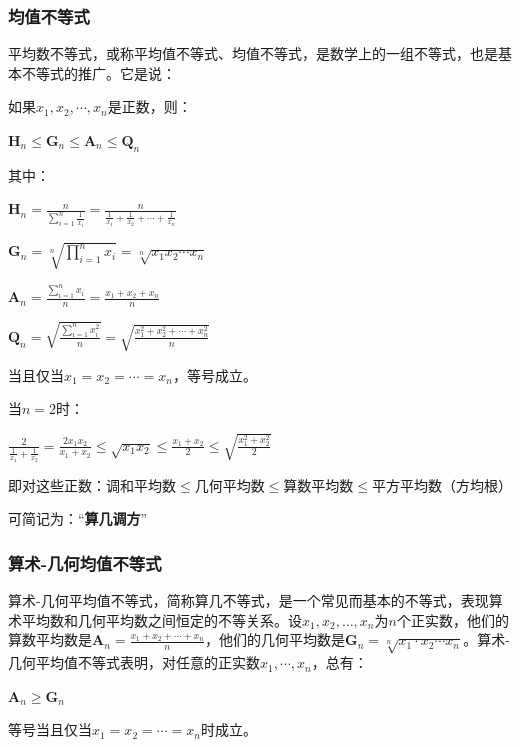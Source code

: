 \documentclass[UTF8]{ctexbook}
\newcommand{\upDownSum}[2]{\sum\limits_{#2}^{#1}}
\newcommand{\upDownProd}[2]{\prod\limits_{#2}^{#1}}
\begin{document}
{{{\subsubsection{均值不等式}{
平均数不等式，或称平均值不等式、均值不等式，是数学上的一组不等式，也是基本不等式的推广。它是说：

如果$x_{1},x_{2},\dotsm,x_{n}$是正数，则：

$\mathbf{H}_n \leq \mathbf{G}_n \leq \mathbf{A}_n \leq \mathbf{Q}_n$

其中：

$\mathbf{H}_n = \frac{n}{\upDownSum{n}{i = 1}\frac{1}{x_i}} = \frac{n}{\frac{1}{x_1} + \frac{1}{x_2} + \dotsm + \frac{1}{x_n}}$

$\mathbf{G}_n = \sqrt[n]{\upDownProd{n}{i = 1}x_i} = \sqrt[n]{x_1x_2\dotsm x_n}$

$\mathbf{A}_n = \frac{\upDownSum{n}{i = 1}x_i}{n} = \frac{x_1 + x_2 + x_n}{n}$

$\mathbf{Q}_n = \sqrt{\frac{\upDownSum{n}{i = 1}x^2_i}{n}} = \sqrt{\frac{x^2_1 + x^2_2 + \dotsm + x^2_n}{n}}$

当且仅当$x_1 = x_2 = \dotsm = x_n$，等号成立。

当$n = 2$时：

$\frac{2}{\frac{1}{x_1} + \frac{1}{x_2}} = \frac{2x_1x_2}{x_1 + x_2}\leq\sqrt{x_1x_2}\leq\frac{x_1 + x_2}{2}\leq\sqrt{\frac{x_1^2 + x_2^2}{2}}$

即对这些正数：调和平均数$\leq$几何平均数$\leq$算数平均数$\leq$平方平均数（方均根）

可简记为：“{\bfseries 算几调方}”
}%

\subsubsection{算术-几何均值不等式}{
  算术-几何平均值不等式，简称算几不等式，是一个常见而基本的不等式，表现算术平均数和几何平均数之间恒定的不等关系。设$x_1,x_2,\dots,x_n$为$n$个正实数，他们的算数平均数是$\mathbf{A}_n = \frac{x_1 + x_2 + \dotsm + x_n}{n}$，他们的几何平均数是$\mathbf{G}_n = \sqrt[n]{x_1\cdot x_2 \dotsm x_n}$。算术-几何平均值不等式表明，对任意的正实数$x_1,\dotsm,x_n$，总有：

  \begin{center}
    $\mathbf{A}_n\geq\mathbf{G}_n$
  \end{center}

  等号当且仅当$x_1 = x_2 = \dotsm = x_n$时成立。

}%

}}}
\end{document}
